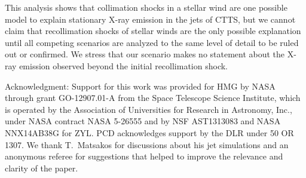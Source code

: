 \documentclass[manuscript]{aastex}
\begin{document}
This analysis shows that collimation shocks in a stellar wind are one possible model to explain stationary X-ray emission in the jets of CTTS, but we cannot claim that recollimation shocks of stellar winds are the only possible explanation until all competing scenarios are analyzed to the same level of detail to be ruled out or confirmed. We stress that our scenario makes no statement about the X-ray emission observed beyond the initial recollimation shock.




Acknowledgment: 
Support for this work was provided for HMG by NASA through grant GO-12907.01-A from the Space Telescope Science Institute, which is operated by the Association of Universities for Research in Astronomy, Inc., under NASA contract NASA 5-26555 and by NSF AST1313083 and NASA NNX14AB38G for ZYL. PCD acknowledges support by the DLR under 50 OR 1307. We thank T.~Matsakos for discussions about his jet simulations and an anonymous referee for suggestions that helped to improve the relevance and clarity of the paper.


\end{document}
